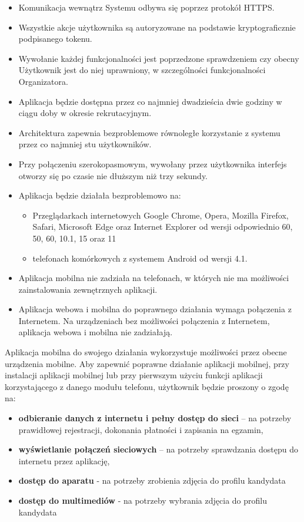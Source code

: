 \documentclass{article}
\begin{document}
\begin{itemize}
	\item Komunikacja wewnątrz Systemu odbywa się poprzez protokół HTTPS.
	\item Wszystkie akcje użytkownika są autoryzowane na podstawie kryptograficznie podpisanego tokenu.
	\item Wywołanie każdej funkcjonalności jest poprzedzone sprawdzeniem czy obecny Użytkownik jest do niej uprawniony, w szczególności funkcjonalności Organizatora.
	\item Aplikacja będzie dostępna przez co najmniej dwadzieścia dwie godziny w ciągu doby w okresie rekrutacyjnym.
	\item Architektura zapewnia bezproblemowe równoległe korzystanie z systemu przez co najmniej stu użytkowników.
	\item Przy połączeniu szerokopasmowym, wywołany przez użytkownika interfejs otworzy się po czasie nie dłuższym niż trzy sekundy. 
	\item Aplikacja będzie działała bezproblemowo na:
	    \begin{itemize}
	        \item Przeglądarkach internetowych Google Chrome, Opera, Mozilla Firefox, Safari, Microsoft Edge oraz Internet Explorer od wersji odpowiednio 60, 50, 60, 10.1, 15 oraz 11
	        \item telefonach komórkowych z systemem Android od wersji 4.1.
	    \end{itemize}
	\item Aplikacja mobilna nie zadziała na telefonach, w których nie ma możliwości zainstalowania zewnętrznych aplikacji.
	\item Aplikacja webowa i mobilna do poprawnego działania wymaga połączenia z Internetem. Na urządzeniach bez możliwości połączenia z Internetem, aplikacja webowa i mobilna nie zadziałają.
\end{itemize}

Aplikacja mobilna do swojego działania wykorzystuje możliwości przez obecne urządzenia mobilne. Aby zapewnić poprawne działanie aplikacji mobilnej, przy instalacji aplikacji mobilnej lub przy pierwszym użyciu funkcji aplikacji korzystającego z danego modułu telefonu, użytkownik będzie proszony o zgodę na:
\begin{itemize}
	\item \textbf{odbieranie danych z internetu i pełny dostęp do sieci} – na potrzeby prawidłowej rejestracji, dokonania płatności i zapisania na egzamin,
	\item \textbf{wyświetlanie połączeń sieciowych} – na potrzeby sprawdzania dostępu do internetu przez aplikację,
	\item \textbf{dostęp do aparatu} - na potrzeby zrobienia zdjęcia do profilu kandydata
	\item \textbf{dostęp do multimediów} - na potrzeby wybrania zdjęcia do profilu kandydata
\end{itemize}
\end{document}
